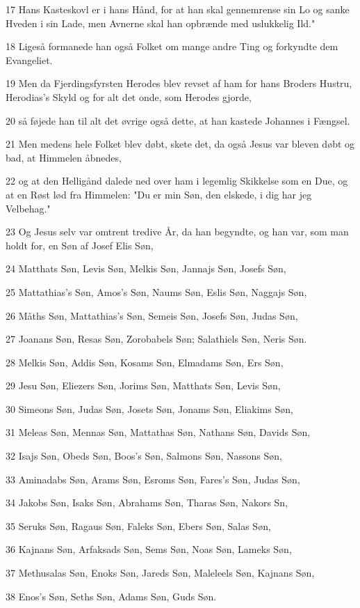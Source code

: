 \par 17 Hans Kasteskovl er i hans Hånd, for at han skal gennemrense sin Lo og sanke Hveden i sin Lade, men Avnerne skal han opbrænde med uslukkelig Ild."
\par 18 Ligeså formanede han også Folket om mange andre Ting og forkyndte dem Evangeliet.
\par 19 Men da Fjerdingsfyrsten Herodes blev revset af ham for hans Broders Hustru, Herodias's Skyld og for alt det onde, som Herodes gjorde,
\par 20 så føjede han til alt det øvrige også dette, at han kastede Johannes i Fængsel.
\par 21 Men medens hele Folket blev døbt, skete det, da også Jesus var bleven døbt og bad, at Himmelen åbnedes,
\par 22 og at den Helligånd dalede ned over ham i legemlig Skikkelse som en Due, og at en Røst lød fra Himmelen: "Du er min Søn, den elskede, i dig har jeg Velbehag."
\par 23 Og Jesus selv var omtrent tredive År, da han begyndte, og han var, som man holdt for, en Søn af Josef Elis Søn,
\par 24 Matthats Søn, Levis Søn, Melkis Søn, Jannajs Søn, Josefs Søn,
\par 25 Mattathias's Søn, Amos's Søn, Naums Søn, Eslis Søn, Naggajs Søn,
\par 26 Måths Søn, Mattathias's Søn, Semeis Søn, Josefs Søn, Judas Søn,
\par 27 Joanans Søn, Resas Søn, Zorobabels Søn; Salathiels Søn, Neris Søn.
\par 28 Melkis Søn, Addis Søn, Kosams Søn, Elmadams Søn, Ers Søn,
\par 29 Jesu Søn, Eliezers Søn, Jorims Søn, Matthats Søn, Levis Søn,
\par 30 Simeons Søn, Judas Søn, Josets Søn, Jonams Søn, Eliakims Søn,
\par 31 Meleas Søn, Mennas Søn, Mattathas Søn, Nathans Søn, Davids Søn,
\par 32 Isajs Søn, Obeds Søn, Boos's Søn, Salmons Søn, Nassons Søn,
\par 33 Aminadabs Søn, Arams Søn, Esroms Søn, Fares's Søn, Judas Søn,
\par 34 Jakobs Søn, Isaks Søn, Abrahams Søn, Tharas Søn, Nakors Sn,
\par 35 Seruks Søn, Ragaus Søn, Faleks Søn, Ebers Søn, Salas Søn,
\par 36 Kajnans Søn, Arfaksads Søn, Sems Søn, Noas Søn, Lameks Søn,
\par 37 Methusalas Søn, Enoks Søn, Jareds Søn, Maleleels Søn, Kajnans Søn,
\par 38 Enos's Søn, Seths Søn, Adams Søn, Guds Søn.

